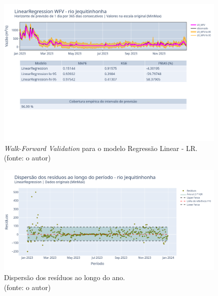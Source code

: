 \begin{figure}[!h]
	\centering
	\includegraphics[scale=0.33]{Figuras/jequiti/wfv/LR/LR_WFV_ORIG.png}
	\caption{\textit{Walk-Forward Validation} para o modelo Regressão Linear - LR.\\(fonte: o autor)}
	\label{fig:jequiti_LR_WFV_ORIG}
\end{figure}


\begin{figure}[!h]
	\centering
	\includegraphics[scale=0.33]{Figuras/jequiti/wfv/LR/LR_WFV_ORIG_RESID_x_TEMPO.png}
	\caption{Dispersão dos resíduos ao longo do ano.\\(fonte: o autor)}
	\label{fig:jequiti_LR_WFV_ORIG_RESID_x_TEMPO}
\end{figure}

